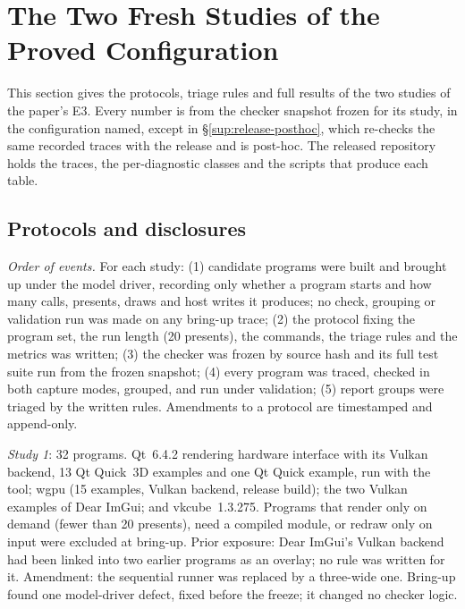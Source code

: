 \section{The Two Fresh Studies of the Proved Configuration}
\label{sup:fresh}

This section gives the protocols, triage rules and full results of the two studies of the paper's E3. Every number
is from the checker snapshot frozen for its study, in the configuration named, except in \S\ref{sup:release-posthoc},
which re-checks the same recorded traces with the release and is post-hoc. The released repository holds the traces, the
per-diagnostic classes and the scripts that produce each table.

\subsection{Protocols and disclosures}
\emph{Order of events.} For each study: (1) candidate programs were built and brought up under the model driver,
recording only whether a program starts and how many calls, presents, draws and host writes it produces; no check,
grouping or validation run was made on any bring-up trace; (2) the protocol fixing the program set, the run length (20
presents), the commands, the triage rules and the metrics was written; (3) the checker was frozen by source hash and
its full test suite run from the frozen snapshot; (4) every program was traced, checked in both capture modes,
grouped, and run under validation; (5) report groups were triaged by the written rules. Amendments to a protocol are
timestamped and append-only.

\emph{Study 1}: 32 programs. Qt~6.4.2 rendering hardware interface with its Vulkan
backend, 13 Qt Quick~3D examples and one Qt Quick example, run with the  tool; wgpu (15 examples, Vulkan
backend, release build); the two Vulkan examples of Dear ImGui; and vkcube~1.3.275. Programs that render only on
demand (fewer than 20 presents), need a compiled module, or redraw only on input were excluded at bring-up. Prior
exposure: Dear ImGui's Vulkan backend had been linked into two earlier programs as an overlay; no rule was written
for it. Amendment: the sequential runner was replaced by a three-wide one. Bring-up found one model-driver defect,
fixed before the freeze; it changed no checker logic.

